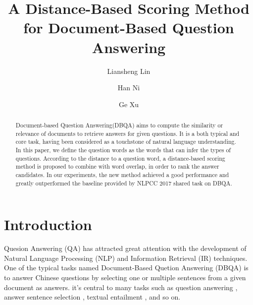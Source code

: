 \documentclass{llncs}
\begin{document}
%
%


%
%
\title{A Distance-Based Scoring Method
for Document-Based Question Answering}
%
%
\author{Liansheng Lin \and Han Ni \and Ge Xu}
%
%
%

\maketitle              %

\begin{abstract}
Document-based Question Answering(DBQA) aims to compute the
similarity or relevance of documents to retrieve answers for given questions. 
It is a both typical and core task, having been considered as a touchstone of 
natural language understanding. In this paper, we define the question words as 
the words that can infer the types of questions. According to the distance to 
a question word, a distance-based scoring method is proposed to combine with 
word overlap, in order to rank the answer candidates. In our experiments, the 
new method achieved a good performance and greatly outperformed the baseline 
provided by NLPCC 2017 shared task on DBQA.
\end{abstract}

\section{Introduction}
Quesion Answering (QA) has attracted great attention with the development of
Natural Language Processing (NLP) and Information Retrieval (IR) techniques.
One of the typical tasks named Document-Based Quetion Answering (DBQA) is to 
answer Chinese questions by selecting one or multiple sentences from a given 
document as answers. it’s central to many tasks such as question answering 
\cite{Hu}\cite{Qiu}, answer sentence selection \cite{Yu}, textual entailment
\cite{Liu:Qiu:Chen}\cite{Liu:Qiu:Huang}, and so on.
\end{document}
